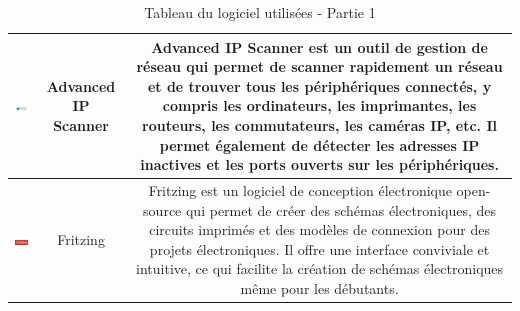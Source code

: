 \begin{table}[H]
\begin{center}
\begin{tabular}{|c{3cm}|c{3cm}|c{10cm}|}
\hline
\includegraphics[width=3cm]{Images/Logo-IPScanner.png} & Advanced IP Scanner & Advanced IP Scanner est un outil de gestion de réseau qui permet de scanner rapidement un réseau et de trouver tous les périphériques connectés, y compris les ordinateurs, les imprimantes, les routeurs, les commutateurs, les caméras IP, etc. Il permet également de détecter les adresses IP inactives et les ports ouverts sur les périphériques.  \\
\hline
\includegraphics[width=3cm]{Images/Logo-Fritzing.png} & Fritzing & Fritzing est un logiciel de conception électronique open-source qui permet de créer des schémas électroniques, des circuits imprimés et des modèles de connexion pour des projets électroniques. Il offre une interface conviviale et intuitive, ce qui facilite la création de schémas électroniques même pour les débutants. \\
\hline
\end{tabular}
\caption{Tableau du logiciel utilisées - Partie 1}
\label{1}
\end{center}
\end{table}


